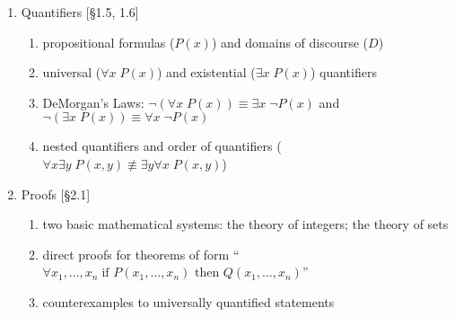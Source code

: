 \documentclass[11pt]{article}
\begin{document}
\begin{enumerate}
\item Quantifiers [\S1.5, 1.6]
\begin{enumerate}
\item propositional formulas ($P(x)$) and domains of discourse ($D$)
\item universal ($\forall x \; P(x)$) and existential ($\exists x \; P(x)$) quantifiers
\item DeMorgan's Laws: $\neg (\forall x \; P(x)) \equiv \exists x \; \neg P(x)$ and $\neg( \exists x \; P(x)) \equiv \forall x \; \neg P(x)$
\item nested quantifiers and order of quantifiers ($\forall x \exists y \; P(x,y) \not \equiv \exists y \forall x \; P(x,y)$)
\end{enumerate}

\item Proofs [\S2.1]
\begin{enumerate}
\item two basic mathematical systems: the theory of integers; the theory of sets
\item direct proofs for theorems of form ``$\forall x_1,\ldots,x_n \; \textrm{if $P(x_1,\ldots,x_n)$ then $Q(x_1,\ldots,x_n)$}$''
\item counterexamples to universally quantified statements
\end{enumerate}

\end{enumerate}
\end{document}
